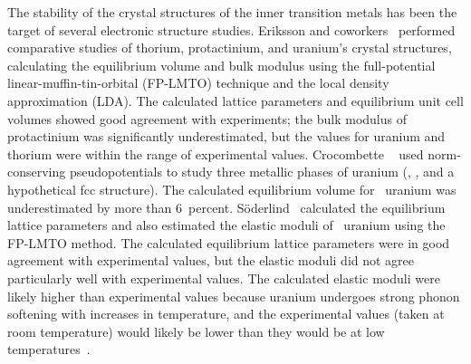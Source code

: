 The stability of the crystal structures of the inner transition metals has been
the target of several electronic structure studies.
Eriksson and coworkers~\cite{wills1992crystal,eriksson1993first} performed
comparative studies of thorium, protactinium, and uranium's crystal
structures, calculating the equilibrium volume and bulk modulus using the
full-potential linear-muffin-tin-orbital (FP-LMTO) technique and the local
density approximation (LDA)\@. The calculated lattice parameters and
equilibrium unit cell volumes showed good agreement with experiments; the
bulk modulus of protactinium was significantly underestimated, but the values
for uranium and thorium were within the range of experimental values.
Crocombette \etal~\cite{crocombette2001plane} used norm-conserving
pseudopotentials to study three metallic phases of uranium (\textalpha,
\textgamma, and a hypothetical fcc structure). The calculated equilibrium
volume for \textalpha~uranium was underestimated by more than 6~percent.
S{\"o}derlind~\cite{soderlind2002first} calculated the equilibrium lattice
parameters and also estimated the elastic moduli of
\textalpha~uranium using the FP-LMTO method. The calculated equilibrium
lattice parameters were in good agreement with experimental values, but
the elastic moduli did not agree particularly well with experimental
values. The calculated elastic moduli were likely higher than experimental
values because uranium undergoes strong phonon softening with increases in
temperature, and the experimental values (taken at room temperature) would
likely be lower than they would be at low
temperatures~\cite{lawson2000melting}.

